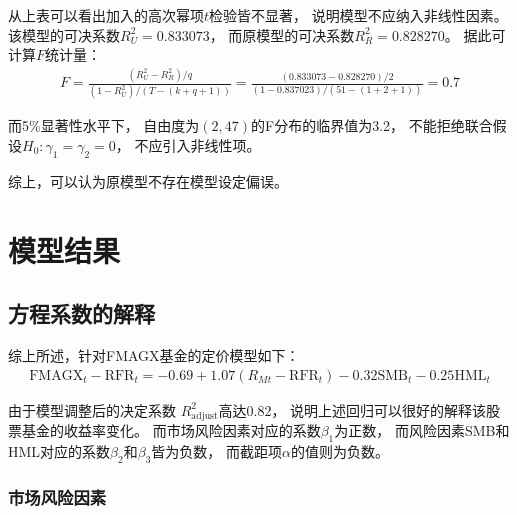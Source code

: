 \documentclass[UTF8]{ctexart}
\begin{document}
从上表可以看出加入的高次幂项$t$检验皆不显著，
说明模型不应纳入非线性因素。
该模型的可决系数$R^2_{U}=0.833073$，
而原模型的可决系数$R^2_{R}=0.828270$。
据此可计算$F$统计量：
\begin{eqnarray}
  F=\frac{\left( R_{U}^{2}-R_{R}^{2} \right) /q}{\left( 1-R_{U}^{2} \right) /(T-(k+q+1))}=\frac{\left( 0.833073-0.828270 \right) /2}{\left( 1-0.837023 \right) /\left( 51-\left( 1+2+1 \right) \right)}=0.7
\end{eqnarray}

而5\%显著性水平下，
自由度为$(2,47)$的F分布的临界值为3.2，
不能拒绝联合假设$H_0:\gamma_1=\gamma_2=0$，
不应引入非线性项。

综上，可以认为原模型不存在模型设定偏误。


\section{模型结果}

\subsection{方程系数的解释}
综上所述，针对FMAGX基金的定价模型如下：
\begin{eqnarray}
  \text{FMAGX}_t-\mathrm{RFR}_t=-0.69+1.07\left( R_{Mt}-\mathrm{RFR}_t \right) -0.32\mathrm{SMB}_t-0.25\mathrm{HML}_t
\end{eqnarray}

由于模型调整后的决定系数
$R^2_{\text{adjust}}$高达0.82，
说明上述回归可以很好的解释该股票基金的收益率变化。
而市场风险因素对应的系数$\beta_1$为正数，
而风险因素SMB和HML对应的系数$\beta_2$和$\beta_3$皆为负数，
而截距项$\alpha$的值则为负数。

\subsubsection{市场风险因素}
\end{document}
